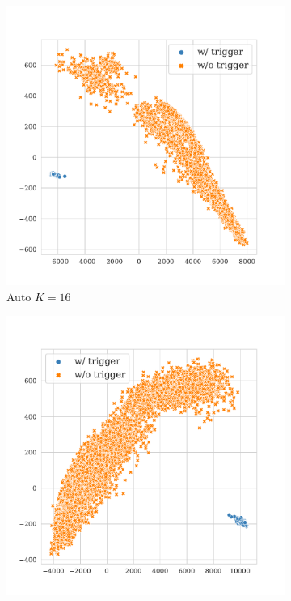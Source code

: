 \begin{figure}[!ht]
\begin{subfigure}{.33\textwidth}
  \centering
  \includegraphics[width=\linewidth]{figures/evaluation_media/mnli-matched-roberta-large-visual-backdoor-auto-k16-seed42-candidates10-poison-cf-1053.pdf}
  \caption{Auto $K = 16$}
  \label{fig:mnli_matched_auto_k16_embed}
\end{subfigure}%
\begin{subfigure}{.33\textwidth}
  \centering
  \includegraphics[width=\linewidth]{figures/evaluation_media/mnli-matched-roberta-large-visual-backdoor-auto-k100-seed42-candidates10-poison-cf-1127.pdf}

\end{subfigure}
\end{figure}

